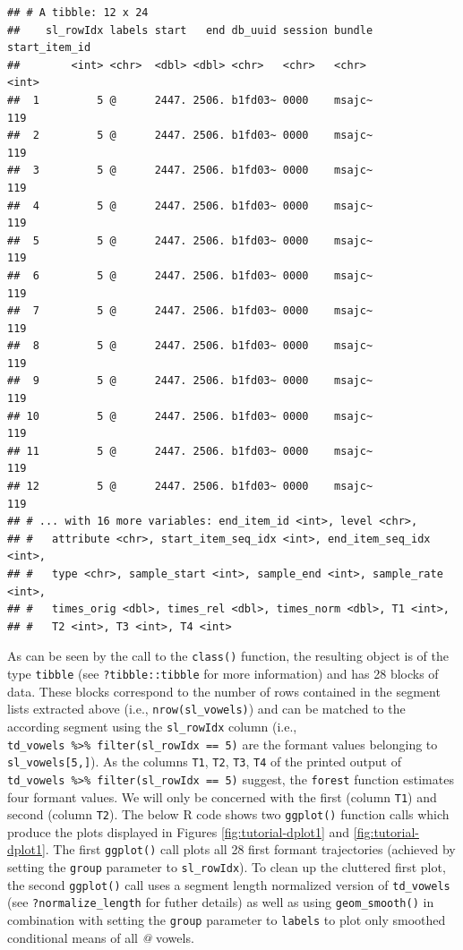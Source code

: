\documentclass[]{book}
\begin{document}
\begin{verbatim}
## # A tibble: 12 x 24
##    sl_rowIdx labels start   end db_uuid session bundle start_item_id
##        <int> <chr>  <dbl> <dbl> <chr>   <chr>   <chr>          <int>
##  1         5 @      2447. 2506. b1fd03~ 0000    msajc~           119
##  2         5 @      2447. 2506. b1fd03~ 0000    msajc~           119
##  3         5 @      2447. 2506. b1fd03~ 0000    msajc~           119
##  4         5 @      2447. 2506. b1fd03~ 0000    msajc~           119
##  5         5 @      2447. 2506. b1fd03~ 0000    msajc~           119
##  6         5 @      2447. 2506. b1fd03~ 0000    msajc~           119
##  7         5 @      2447. 2506. b1fd03~ 0000    msajc~           119
##  8         5 @      2447. 2506. b1fd03~ 0000    msajc~           119
##  9         5 @      2447. 2506. b1fd03~ 0000    msajc~           119
## 10         5 @      2447. 2506. b1fd03~ 0000    msajc~           119
## 11         5 @      2447. 2506. b1fd03~ 0000    msajc~           119
## 12         5 @      2447. 2506. b1fd03~ 0000    msajc~           119
## # ... with 16 more variables: end_item_id <int>, level <chr>,
## #   attribute <chr>, start_item_seq_idx <int>, end_item_seq_idx <int>,
## #   type <chr>, sample_start <int>, sample_end <int>, sample_rate <int>,
## #   times_orig <dbl>, times_rel <dbl>, times_norm <dbl>, T1 <int>,
## #   T2 <int>, T3 <int>, T4 <int>
\end{verbatim}

As can be seen by the call to the \texttt{class()} function, the resulting object is of the type \texttt{tibble} (see \texttt{?tibble::tibble} for more information) and has 28 blocks of data. These blocks correspond to the number of rows contained in the segment lists extracted above (i.e., \texttt{nrow(sl\_vowels)}) and can be matched to the according segment using the \texttt{sl\_rowIdx} column (i.e., \texttt{td\_vowels\ \%\textgreater{}\%\ filter(sl\_rowIdx\ ==\ 5)} are the formant values belonging to \texttt{sl\_vowels{[}5,{]}}). As the columns \texttt{T1}, \texttt{T2}, \texttt{T3}, \texttt{T4} of the printed output of \texttt{td\_vowels\ \%\textgreater{}\%\ filter(sl\_rowIdx\ ==\ 5)} suggest, the \texttt{forest} function estimates four formant values. We will only be concerned with the first (column \texttt{T1}) and second (column \texttt{T2}). The below R code shows two \texttt{ggplot()} function calls which produce the plots displayed in Figures \ref{fig:tutorial-dplot1} and \ref{fig:tutorial-dplot1}. The first \texttt{ggplot()} call plots all 28 first formant trajectories (achieved by setting the \texttt{group} parameter to \texttt{sl\_rowIdx}). To clean up the cluttered first plot, the second \texttt{ggplot()} call uses a segment length normalized version of \texttt{td\_vowels} (see \texttt{?normalize\_length} for futher details) as well as using \texttt{geom\_smooth()} in combination with setting the \texttt{group} parameter to \texttt{labels} to plot only smoothed conditional means of all \emph{@} vowels.
\end{document}

